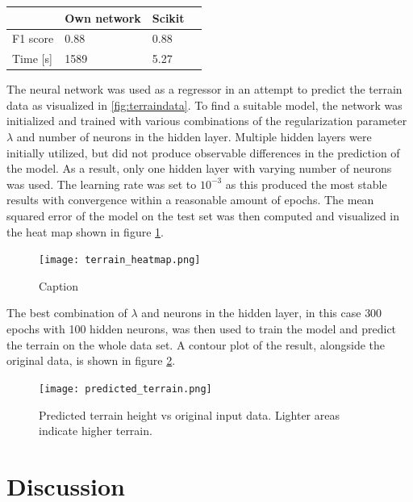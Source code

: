 \documentclass[a4paper,10pt,english]{article}
\begin{document}
\begin{table}[] \centering
\begin{tabular}{|l|l|l|l}
\hline
         & Own network & Scikit \\ \hline
F1 score & 0.88      & 0.88   \\ \hline
Time [s] & 1589 & 5.27 \\ \hline
\end{tabular}
\label{tab:neuralnet_own_scikit}
\end{table}

The neural network was used as a regressor in an attempt to predict the terrain data as visualized in \ref{fig:terraindata}. To find a suitable model, the network was initialized and trained with various combinations of the regularization parameter $\lambda$ and number of neurons in the hidden layer. Multiple hidden layers were initially utilized, but did not produce observable differences in the prediction of the model. As a result, only one hidden layer with varying number of neurons was used. The learning rate was set to $10^{-3}$ as this produced the most stable results with convergence within a reasonable amount of epochs. The mean squared error of the model on the test set was then computed and visualized in the heat map shown in figure \ref{fig:terrain_heatmap}.

\begin{figure}
    \centering
    \texttt{[image: terrain\_heatmap.png]}
    \caption{Caption}
    \label{fig:terrain_heatmap}
\end{figure}

The best combination of $\lambda$ and neurons in the hidden layer, in this case $300$ epochs with 100 hidden neurons, was then used to train the model and predict the terrain on the whole data set. A contour plot of the result, alongside the original data, is shown in figure \ref{fig:predicted_terrain}.

\begin{figure}
    \centering
    \texttt{[image: predicted\_terrain.png]}
    \caption{Predicted terrain height vs original input data. Lighter areas indicate higher terrain.}
    \label{fig:predicted_terrain}
\end{figure}

\section{Discussion}
\end{document}
